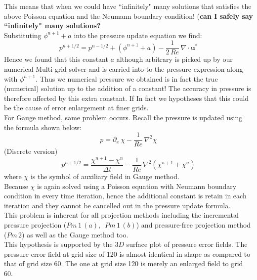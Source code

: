 This means that when we could have ``infinitely" many solutions that satisfies the above Poisson equation and the Neumann boundary condition! (\textbf{can I safely say ``infinitely" many solutions?}\\

Substituting $\phi^{n+1} + a $ into the pressure update equation we find:
\begin{equation}
p^{n+1/2} = p^{n-1/2} + (\phi^{n+1} + a) - \dfrac{1}{2\,Re}\,\nabla \cdot \textbf{u}^*
\end{equation}
Hence we found that this constant $a$ although arbitrary is picked up by our numerical Multi-grid solver and is carried into to the pressure expression along with $\phi^{n+1}$. Thus we numerical pressure we obtained is in fact the true (numerical) solution up to the addition of a constant! The accuracy in pressure is therefore affected by this extra constant. If In fact we hypotheses that this could be the cause of error enlargement at finer grids.\\

For Gauge method, same problem occurs. Recall the pressure is updated using the formula shown below:
\begin{equation*}
p = \partial_x\,\chi - \dfrac{1}{Re}\,\nabla^2 \chi
\end{equation*}
(Discrete version)
\begin{equation*}
p^{n+1/2} = \dfrac{\chi^{n+1} - \chi^{n}}{\Delta t} - \dfrac{1}{Re}\,\nabla^2(\chi^{n+1} + \chi^n)
\end{equation*}
where $\chi$ is the symbol of auxiliary field in Gauge method. \\
Because $\chi$ is again solved using a Poisson equation with Neumann boundary condition in every time iteration, hence the additional constant is retain in each iteration and they cannot be cancelled out in the pressure update formula. \\


This problem is inherent for all projection methods including the incremental pressure projection ($Pm\,1\,(a),\,\,\,Pm\,1\,(b)$) and pressure-free projection method ($Pm\,2$) as well as the Gauge method too.\\

This hypothesis is supported by the $3D$ surface plot of pressure error fields. The pressure error field at grid size of 120 is almost identical in shape as compared to that of grid size 60. The one at grid size 120 is merely an enlarged field to grid 60.\\

